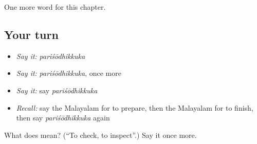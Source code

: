 \begin{grammarlens}[title={What you've built}]
One more word for this chapter.
\end{grammarlens}

\subsection*{Your turn}
\begin{itemize}
\raggedright
  \item \emph{Say it:} \emph{pariśōdhikkuka}
  \item \emph{Say it:} \emph{pariśōdhikkuka}, once more
  \item \emph{Say it:} say \emph{pariśōdhikkuka}
  \item \emph{Recall:} say the Malayalam for to prepare, then the Malayalam for to finish, then say \emph{pariśōdhikkuka} again
\end{itemize}

\begin{tcolorbox}[breakable,colback=teal!4,colframe=teal!35!black,title={Before you move on}]
What does  mean? (\textquotedblleft{}To check, to inspect\textquotedblright{}.) Say it once more.
\end{tcolorbox}
